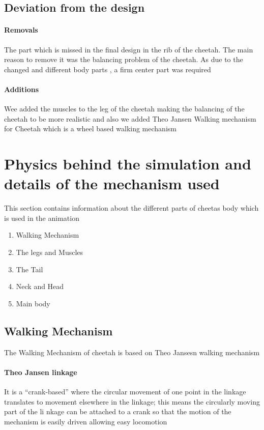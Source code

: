 \documentclass[11pt]{article}
\begin{document}
\subsection{Deviation from the design}
\paragraph{Removals}
The part which is missed in the final design in the rib of the cheetah. The main reason to remove it was the balancing problem of the cheetah. As due to the changed and different body parts , a firm center part was required
\paragraph{Additions}
Wee added the muscles to the leg of the cheetah making the balancing of the cheetah to be more realistic and also we added Theo Jansen\cite{jansen} Walking mechanism for Cheetah which is a wheel based walking mechanism
\section{Physics behind the simulation and details of the mechanism used}
This section contains information about the different parts of cheetas body which is used in the animation
\begin{enumerate}
	  \item Walking Mechanism
	  \item The legs and Muscles
   	 \item The Tail
     \item Neck and Head
     \item Main body
\end{enumerate}
\subsection{Walking Mechanism}
The Walking Mechanism of cheetah is based on Theo Jansesn\cite{jansen} walking mechanism
\paragraph{Theo Jansen linkage}
It is a “crank-based” where the circular movement of
one point in the linkage translates to movement elsewhere in the linkage; this means the
circularly moving part of the li
nkage can be attached to a crank so that the motion of the
mechanism is easily driven allowing easy locomotion
\end{document}
